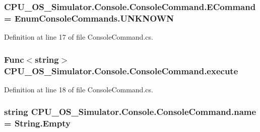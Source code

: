 \subsubsection[{E\+Command}]{ C\+P\+U\+\_\+\+O\+S\+\_\+\+Simulator.\+Console.\+Console\+Command.\+E\+Command = {\bf Enum\+Console\+Commands.\+U\+N\+K\+N\+O\+W\+N}\hspace{0.3cm}{\ttfamily [private]}}\label{class_c_p_u___o_s___simulator_1_1_console_1_1_console_command_a623b0c35b5b676fa1931c62dde508486}


Definition at line 17 of file Console\+Command.\+cs.

\hypertarget{class_c_p_u___o_s___simulator_1_1_console_1_1_console_command_a14965572ab7b76a453e1dd49d268b48a}{}
\subsubsection[{execute}]{\setlength{\rightskip}{0pt plus 5cm}Func$<$string$>$ C\+P\+U\+\_\+\+O\+S\+\_\+\+Simulator.\+Console.\+Console\+Command.\+execute\hspace{0.3cm}{\ttfamily [private]}}\label{class_c_p_u___o_s___simulator_1_1_console_1_1_console_command_a14965572ab7b76a453e1dd49d268b48a}


Definition at line 18 of file Console\+Command.\+cs.

\hypertarget{class_c_p_u___o_s___simulator_1_1_console_1_1_console_command_a0ba819d58268ef4f9bab12089a9fd1a4}{}
\subsubsection[{name}]{\setlength{\rightskip}{0pt plus 5cm}string C\+P\+U\+\_\+\+O\+S\+\_\+\+Simulator.\+Console.\+Console\+Command.\+name = String.\+Empty\hspace{0.3cm}{\ttfamily [private]}}\label{class_c_p_u___o_s___simulator_1_1_console_1_1_console_command_a0ba819d58268ef4f9bab12089a9fd1a4}


